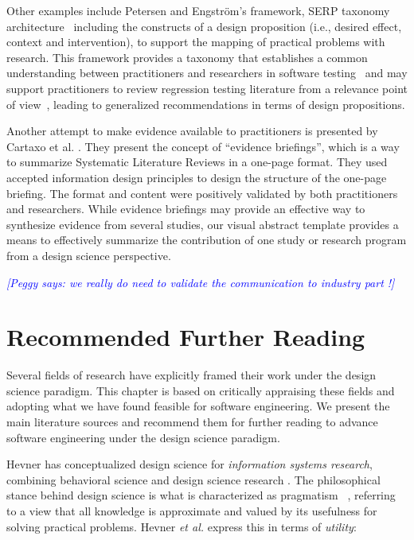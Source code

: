\documentclass[graybox]{svmult}
\newcommand{\emelie}[1]{\textcolor{red}{{\it [Emelie says: #1]}}}
\newcommand{\peggy}[1]{\textcolor{blue}{{\it [Peggy says: #1]}}}
\newcommand{\emelie}[1]{}
\newcommand{\peggy}[1]{}
\begin{document}
Other examples include Petersen and Engstr\"om's framework, SERP taxonomy architecture~\cite{petersen_finding_2014} including the constructs of a design proposition  
(i.e., desired effect, context and intervention), to support the mapping of practical problems with research. 
This framework provides a taxonomy that establishes a common understanding between practitioners and researchers in software testing~\cite{engstrom_SERP-test_2017} and may support practitioners to review regression testing literature from a relevance point of view~\cite{ali_search_2019}, leading to generalized recommendations in terms of design propositions. 

Another attempt to make evidence available to practitioners is presented by Cartaxo et al. \cite{Cartaxo2016}. 
They present the concept of ``evidence briefings'', which is a way to summarize Systematic Literature Reviews in a one-page format. 
They used accepted information design principles to design the structure of the one-page briefing. The format and content were positively validated by both practitioners and researchers. While evidence briefings may provide an effective way to synthesize evidence from several studies, our visual abstract template provides a means to effectively summarize the contribution of one study or research program from a design science perspective.

\peggy{we really do need to validate the communication to industry part !}



\section{Recommended Further Reading}
\label{sec:reading}
Several fields of research have explicitly framed their work under the design science paradigm. This chapter is based on critically appraising these fields and adopting what we have found feasible for software engineering. We present the main literature sources and recommend them for further reading to advance software engineering under the design science paradigm.

Hevner has conceptualized design science for \emph{information systems research}, combining behavioral science and design science research \cite{hevner_design_2004,hevner_design_2010}.
The philosophical stance behind design science is what is characterized as pragmatism~\cite{easterbrook_selecting_2008}%
, referring to a view that all knowledge is approximate and valued by its usefulness for solving practical problems. Hevner \emph{et al.} express this in terms of \emph{utility}: 
\end{document}
